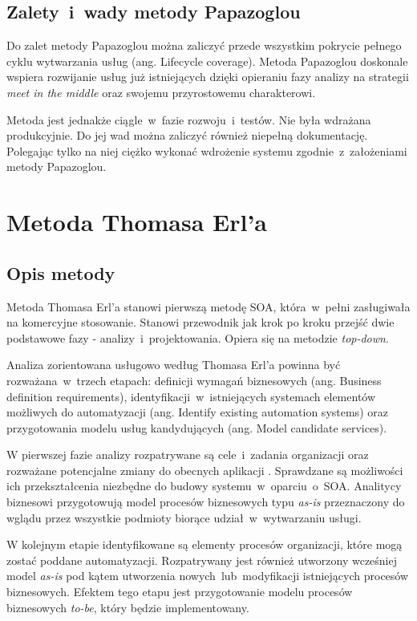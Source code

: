 \subsection{Zalety~i~wady metody Papazoglou}
Do zalet metody Papazoglou można zaliczyć przede wszystkim pokrycie pełnego cyklu wytwarzania usług (ang. Lifecycle coverage). Metoda Papazoglou doskonale wspiera rozwijanie usług już istniejących dzięki opieraniu fazy analizy na strategii \emph{meet in the middle} oraz swojemu przyrostowemu charakterowi. 

Metoda jest jednakże ciągle~w~fazie rozwoju~i~testów. Nie była wdrażana produkcyjnie. Do jej wad można zaliczyć również niepełną dokumentację. Polegając tylko na niej ciężko wykonać wdrożenie systemu zgodnie~z~założeniami metody Papazoglou. \cite{RamErvSOA}

\section{Metoda Thomasa Erl'a}

\subsection{Opis metody}
Metoda Thomasa Erl'a stanowi pierwszą metodę SOA, która~w~pełni zasługiwała na komercyjne stosowanie. Stanowi przewodnik jak krok po kroku przejść dwie podstawowe fazy - analizy~i~projektowania. Opiera się na metodzie \emph{top-down}.

Analiza zorientowana usługowo według Thomasa Erl'a powinna być rozważana~w~trzech etapach: definicji wymagań biznesowych (ang. Business definition requirements), identyfikacji~w~istniejących systemach elementów możliwych do automatyzacji (ang. Identify  existing 
automation systems) oraz przygotowania modelu usług kandydujących (ang. Model candidate services). 

W pierwszej fazie analizy rozpatrywane są cele~i~zadania organizacji oraz rozważane  potencjalne zmiany do obecnych aplikacji . Sprawdzane są możliwości ich przekształcenia niezbędne do budowy systemu~w~oparciu~o~SOA. Analitycy biznesowi przygotowują model procesów biznesowych typu \emph{as-is} przeznaczony do wglądu przez wszystkie podmioty biorące udział~w~wytwarzaniu usługi. 

W kolejnym etapie identyfikowane są elementy procesów organizacji, które mogą zostać poddane automatyzacji. Rozpatrywany jest również utworzony wcześniej model \emph{as-is} pod kątem utworzenia nowych~lub~modyfikacji istniejących procesów biznesowych. Efektem tego etapu jest przygotowanie modelu procesów biznesowych \emph{to-be}, który będzie implementowany.

